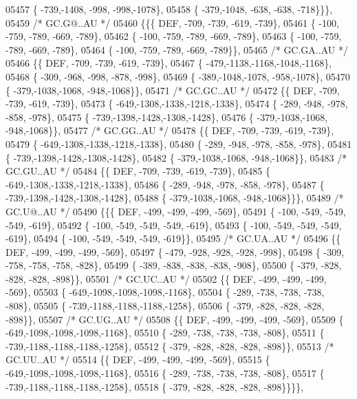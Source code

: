\begin{DoxyCode}
05457 \{ -739,-1408, -998, -998,-1078\},
05458 \{ -379,-1048, -638, -638, -718\}\}\},
05459 \textcolor{comment}{/* GC.G@..AU */}
05460 \{\{\{  DEF, -709, -739, -619, -739\},
05461 \{ -100, -759, -789, -669, -789\},
05462 \{ -100, -759, -789, -669, -789\},
05463 \{ -100, -759, -789, -669, -789\},
05464 \{ -100, -759, -789, -669, -789\}\},
05465 \textcolor{comment}{/* GC.GA..AU */}
05466 \{\{  DEF, -709, -739, -619, -739\},
05467 \{ -479,-1138,-1168,-1048,-1168\},
05468 \{ -309, -968, -998, -878, -998\},
05469 \{ -389,-1048,-1078, -958,-1078\},
05470 \{ -379,-1038,-1068, -948,-1068\}\},
05471 \textcolor{comment}{/* GC.GC..AU */}
05472 \{\{  DEF, -709, -739, -619, -739\},
05473 \{ -649,-1308,-1338,-1218,-1338\},
05474 \{ -289, -948, -978, -858, -978\},
05475 \{ -739,-1398,-1428,-1308,-1428\},
05476 \{ -379,-1038,-1068, -948,-1068\}\},
05477 \textcolor{comment}{/* GC.GG..AU */}
05478 \{\{  DEF, -709, -739, -619, -739\},
05479 \{ -649,-1308,-1338,-1218,-1338\},
05480 \{ -289, -948, -978, -858, -978\},
05481 \{ -739,-1398,-1428,-1308,-1428\},
05482 \{ -379,-1038,-1068, -948,-1068\}\},
05483 \textcolor{comment}{/* GC.GU..AU */}
05484 \{\{  DEF, -709, -739, -619, -739\},
05485 \{ -649,-1308,-1338,-1218,-1338\},
05486 \{ -289, -948, -978, -858, -978\},
05487 \{ -739,-1398,-1428,-1308,-1428\},
05488 \{ -379,-1038,-1068, -948,-1068\}\}\},
05489 \textcolor{comment}{/* GC.U@..AU */}
05490 \{\{\{  DEF, -499, -499, -499, -569\},
05491 \{ -100, -549, -549, -549, -619\},
05492 \{ -100, -549, -549, -549, -619\},
05493 \{ -100, -549, -549, -549, -619\},
05494 \{ -100, -549, -549, -549, -619\}\},
05495 \textcolor{comment}{/* GC.UA..AU */}
05496 \{\{  DEF, -499, -499, -499, -569\},
05497 \{ -479, -928, -928, -928, -998\},
05498 \{ -309, -758, -758, -758, -828\},
05499 \{ -389, -838, -838, -838, -908\},
05500 \{ -379, -828, -828, -828, -898\}\},
05501 \textcolor{comment}{/* GC.UC..AU */}
05502 \{\{  DEF, -499, -499, -499, -569\},
05503 \{ -649,-1098,-1098,-1098,-1168\},
05504 \{ -289, -738, -738, -738, -808\},
05505 \{ -739,-1188,-1188,-1188,-1258\},
05506 \{ -379, -828, -828, -828, -898\}\},
05507 \textcolor{comment}{/* GC.UG..AU */}
05508 \{\{  DEF, -499, -499, -499, -569\},
05509 \{ -649,-1098,-1098,-1098,-1168\},
05510 \{ -289, -738, -738, -738, -808\},
05511 \{ -739,-1188,-1188,-1188,-1258\},
05512 \{ -379, -828, -828, -828, -898\}\},
05513 \textcolor{comment}{/* GC.UU..AU */}
05514 \{\{  DEF, -499, -499, -499, -569\},
05515 \{ -649,-1098,-1098,-1098,-1168\},
05516 \{ -289, -738, -738, -738, -808\},
05517 \{ -739,-1188,-1188,-1188,-1258\},
05518 \{ -379, -828, -828, -828, -898\}\}\}\},

\end{DoxyCode}
